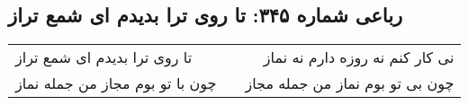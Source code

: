 \begin{center}
\section*{رباعی شماره ۳۴۵: تا روی ترا بدیدم ای شمع تراز}
\label{sec:sh345}
\begin{longtable}{l p{0.5cm} r}
تا روی ترا بدیدم ای شمع تراز
&&
نی کار کنم نه روزه دارم نه نماز
\\
چون با تو بوم مجاز من جمله نماز
&&
چون بی تو بوم نماز من جمله مجاز
\\
\end{longtable}
\end{center}

